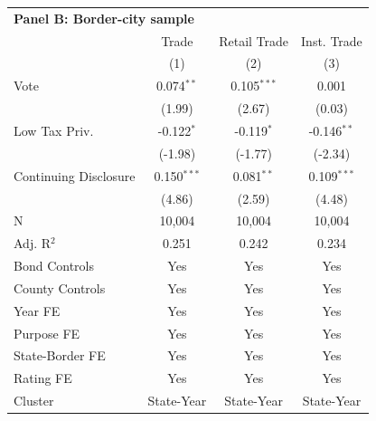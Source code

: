 \begingroup
\centering
\begin{tabular*}{\textwidth}{@{\extracolsep{\fill}}lccc}
\multicolumn{5}{l}{\textbf{Panel B: Border-city sample}}\\

\addlinespace
   \toprule
                         & Trade         & Retail Trade  & Inst. Trade\\  
                         & (1)           & (2)           & (3)\\  
   \midrule 
   Vote                  & 0.074$^{**}$  & 0.105$^{***}$ & 0.001\\   
                         & (1.99)       & (2.67)       & (0.03)\\   
   Low Tax Priv.         & -0.122$^{*}$  & -0.119$^{*}$  & -0.146$^{**}$\\   
                         & (-1.98)      & (-1.77)      & (-2.34)\\   
   Continuing Disclosure & 0.150$^{***}$ & 0.081$^{**}$  & 0.109$^{***}$\\   
                         & (4.86)       & (2.59)       & (4.48)\\   
   \hline
   N          & 10,004        & 10,004        & 10,004\\  
   Adj. R$^2$        & 0.251         & 0.242         & 0.234\\  
   Bond Controls         & Yes           & Yes           & Yes\\  
   County Controls       & Yes           & Yes           & Yes\\  
   Year FE               & Yes           & Yes           & Yes\\  
   Purpose FE            & Yes           & Yes           & Yes\\  
   State-Border FE       & Yes           & Yes           & Yes\\  
   Rating FE             & Yes           & Yes           & Yes\\  
   Cluster              & State-Year & State-Year & State-Year\\  
   \bottomrule
\end{tabular*}
\par\endgroup

